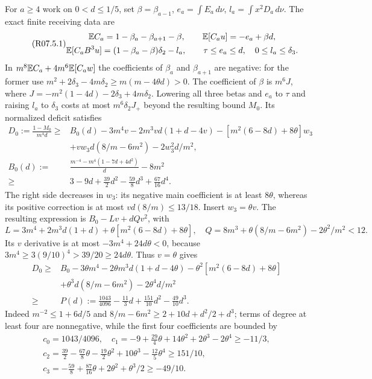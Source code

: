 For $a\ge4$ work on $0<d\le1/5$, set $\beta=\beta_{a-1}$,
$e_a=\int E_a\,d\nu$, $l_a=\int x^2D_a\,d\nu$. The exact finite
receiving data are
\begin{equation}\tag{R07.5.1}\label{eq:R07:covariance}
\begin{gathered}
 \mathbb E C_a=1-\beta_a-\beta_{a+1}-\beta,\qquad
 \mathbb E[C_au]=-e_a+\beta d,\\
 \mathbb E[C_aB^3u]=(1-\beta_a-\beta)\delta_2-l_a,\qquad
 \tau\le e_a\le d,\quad0\le l_a\le\delta_3.
\end{gathered}
\end{equation}
In $m^8\mathbb E C_a+4m^6\mathbb E[C_aw]$ the coefficients of $\beta_a$ and
$\beta_{a+1}$ are negative: for the former use
$m^2+2\delta_3-4m\delta_2\ge m(m-4\theta d)>0$.
The coefficient of $\beta$ is $m^6J$, where
$J=-m^2(1-4d)-2\delta_3+4m\delta_2$.
Lowering all three betas and $e_a$ to $\tau$ and raising $l_a$ to
$\delta_3$ costs at most $m^6\delta_2J_+$ beyond the resulting bound $M_0$.
Its normalized deficit satisfies
\begin{align*}
 D_0:=\frac{1-M_0}{m^4d}\ge{}&B_0(d)-3m^4v-2m^3vd(1+d-4v)
 -[m^2(6-8d)+8\theta]w_3\\
 &+vw_3d(8/m-6m^2)-2w_3^2d/m^2,\\
 B_0(d):={}&\frac{m^{-4}-m^4(1-7d+4d^2)}d-8m^2\\
 \ge{}&3-9d+\tfrac{39}{2}d^2-\tfrac{59}{8}d^3+\tfrac{67}{16}d^4.
\end{align*}
The right side decreases in $w_3$: its negative main coefficient is
at least $8\theta$, whereas its positive correction is at most
$vd(8/m)\le13/18$. Insert $w_3=\theta v$. The resulting expression is
$B_0-Lv+dQv^2$, with
\[
 L=3m^4+2m^3d(1+d)+\theta[m^2(6-8d)+8\theta],\quad
 Q=8m^3+\theta(8/m-6m^2)-2\theta^2/m^2<12.
\]
Its $v$ derivative is at most $-3m^4+24d\theta<0$, because
$3m^4\ge3(9/10)^4>39/20\ge24d\theta$. Thus $v=\theta$ gives
\begin{align*}
 D_0\ge{}&B_0-3\theta m^4-2\theta m^3d(1+d-4\theta)
 -\theta^2[m^2(6-8d)+8\theta]\\
 &+\theta^3d(8/m-6m^2)-2\theta^4d/m^2\\
 \ge{}&P(d):=\tfrac{1043}{4096}-\tfrac{11}{3}d
                +\tfrac{151}{10}d^2-\tfrac{49}{10}d^3.
\end{align*}
Indeed $m^{-2}\le1+6d/5$ and
$8/m-6m^2\ge2+10d+d^2/2+d^3$; terms of degree at least four are
nonnegative, while the first four coefficients are bounded by
\[
\begin{gathered}
c_0=1043/4096,\quad
c_1=-9+\tfrac{29}{4}\theta+14\theta^2+2\theta^3-2\theta^4\ge-11/3,\\
c_2=\tfrac{39}{2}-\tfrac{67}{8}\theta-\tfrac{19}{2}\theta^2
       +10\theta^3-\tfrac{12}{5}\theta^4\ge151/10,\\
c_3=-\tfrac{59}{8}+\tfrac{87}{16}\theta+2\theta^2+\theta^3/2\ge-49/10.
\end{gathered}
\]
